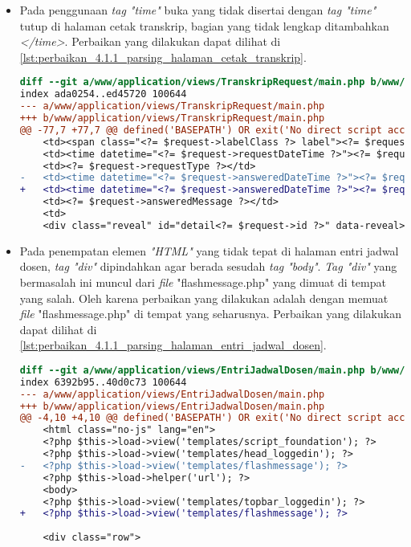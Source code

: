 \begin{itemize}
\item Pada penggunaan \textit{tag "time"} buka yang tidak disertai dengan \textit{tag "time"} tutup di halaman cetak transkrip, bagian yang tidak lengkap ditambahkan \textit{</time>}. Perbaikan yang dilakukan dapat dilihat di \ref{lst:perbaikan_4.1.1_parsing_halaman_cetak_transkrip}.
\begin{lstlisting}[frame=single, label={lst:perbaikan_4.1.1_parsing_halaman_cetak_transkrip}, language=diff, caption=Perbaikan Kriteria Sukses 4.1.1 - Kesalahan Elemen pada Halaman Cetak Transkrip]
diff --git a/www/application/views/TranskripRequest/main.php b/www/application/views/TranskripRequest/main.php
index ada0254..ed45720 100644
--- a/www/application/views/TranskripRequest/main.php
+++ b/www/application/views/TranskripRequest/main.php
@@ -77,7 +77,7 @@ defined('BASEPATH') OR exit('No direct script access allowed');
    <td><span class="<?= $request->labelClass ?> label"><?= $request->status ?></span></td>
    <td><time datetime="<?= $request->requestDateTime ?>"><?= $request->requestDateString ?></time></td>
    <td><?= $request->requestType ?></td>
-   <td><time datetime="<?= $request->answeredDateTime ?>"><?= $request->answeredDateString ?></td>
+   <td><time datetime="<?= $request->answeredDateTime ?>"><?= $request->answeredDateString ?></time></td>
    <td><?= $request->answeredMessage ?></td>
    <td>
    <div class="reveal" id="detail<?= $request->id ?>" data-reveal>
\end{lstlisting} 

\item Pada penempatan elemen \textit{"HTML"} yang tidak tepat di halaman entri jadwal dosen, \textit{tag "div"} dipindahkan agar berada sesudah \textit{tag "body"}. \textit{Tag "div"} yang bermasalah ini muncul dari \textit{file} "flashmessage.php" yang dimuat di tempat yang salah. Oleh karena perbaikan yang dilakukan adalah dengan memuat \textit{file} "flashmessage.php" di tempat yang seharusnya. Perbaikan yang dilakukan dapat dilihat di \ref{lst:perbaikan_4.1.1_parsing_halaman_entri_jadwal_dosen}.
\begin{lstlisting}[frame=single, label={lst:perbaikan_4.1.1_parsing_halaman_entri_jadwal_dosen}, language=diff, caption=Perbaikan Kriteria Sukses 4.1.1 - Kesalahan Elemen pada Halaman Entri Jadwal Dosen]
diff --git a/www/application/views/EntriJadwalDosen/main.php b/www/application/views/EntriJadwalDosen/main.php
index 6392b95..40d0c73 100644
--- a/www/application/views/EntriJadwalDosen/main.php
+++ b/www/application/views/EntriJadwalDosen/main.php
@@ -4,10 +4,10 @@ defined('BASEPATH') OR exit('No direct script access allowed');
    <html class="no-js" lang="en">
    <?php $this->load->view('templates/script_foundation'); ?>
    <?php $this->load->view('templates/head_loggedin'); ?>
-	<?php $this->load->view('templates/flashmessage'); ?>
    <?php $this->load->helper('url'); ?>
    <body>
    <?php $this->load->view('templates/topbar_loggedin'); ?>
+   <?php $this->load->view('templates/flashmessage'); ?>
 
    <div class="row">
\end{lstlisting} 
\end{itemize}